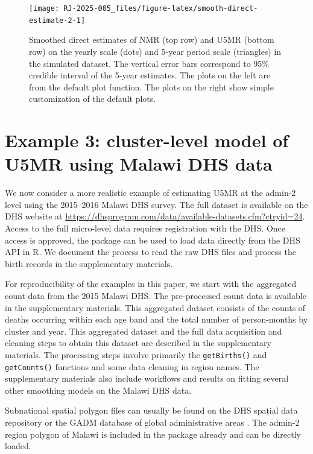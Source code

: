 \begin{figure}[!ht]
\texttt{[image: RJ-2025-005\_files/figure-latex/smooth-direct-estimate-2-1]} \caption{Smoothed direct estimates of NMR (top row) and U5MR (bottom row) on the yearly scale (dots) and 5-year period scale (triangles) in the simulated dataset. The vertical error bars correspond to 95\% credible interval of the 5-year estimates. The plots on the left are from the default plot function. The plots on the right show simple customization of the default plots.}\label{fig:smooth-direct-estimate-2}
\end{figure}

\section{Example 3: cluster-level model of U5MR using Malawi DHS data}\label{example-3-cluster-level-model-of-u5mr-using-malawi-dhs-data}

We now consider a more realistic example of estimating U5MR at the admin-2 level using the 2015--2016 Malawi DHS survey. The full dataset is available on the DHS website at \url{https://dhsprogram.com/data/available-datasets.cfm?ctryid=24}. Access to the full micro-level data requires registration with the DHS. Once access is approved, the  \citep{rdhs} package can be used to load data directly from the DHS API in R. We document the process to read the raw DHS files and process the birth records in the supplementary materials.

For reproducibility of the examples in this paper, we start with the aggregated count data from the 2015 Malawi DHS. The pre-processed count data is available in the supplementary materials. This aggregated dataset consists of the counts of deaths occurring within each age band and the total number of person-months by cluster and year. This aggregated dataset and the full data acquisition and cleaning steps to obtain this dataset are described in the supplementary materials. The processing steps involve primarily the \texttt{getBirths()} and \texttt{getCounts()} functions and some data cleaning in region names. The supplementary materials also include workflows and results on fitting several other smoothing models on the Malawi DHS data.

Subnational spatial polygon files can usually be found on the DHS spatial data repository \citep{dhsspatial} or the GADM database of global administrative areas \citep{areas2012gadm}. The admin-2 region polygon of Malawi is included in the  package already and can be directly loaded.


